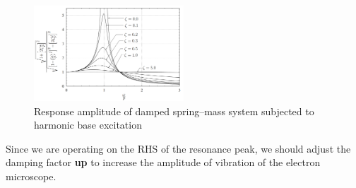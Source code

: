 \subsection{}
\begin{figure}[h]
    \centering
    \includegraphics[width=0.5\textwidth]{Questions/Figures/q3 dmf diagram.png}
    \caption{Response amplitude of damped spring–mass system subjected to harmonic base
    excitation}
\end{figure}
Since we are operating on the RHS of the resonance peak, we should adjust the damping factor \textbf{up} to increase the amplitude of vibration of the electron microscope.